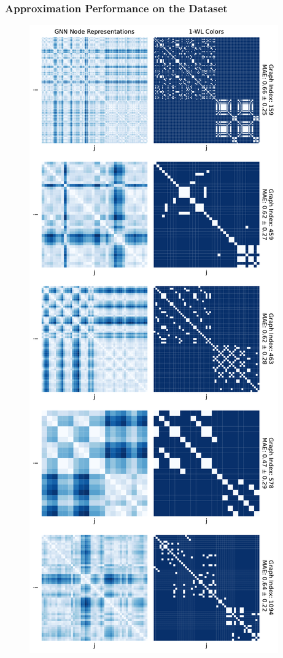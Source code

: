 \subsubsection{Approximation Performance on the \proteins Dataset}
\begin{figure}[H]
    \centering
    \begin{minipage}[b]{0.45992852703\textwidth}
        \centering
        \includegraphics[width=\textwidth, left]{Figures/heatmaps_PROTEINS_0.pdf}

\end{minipage}
\end{figure}
